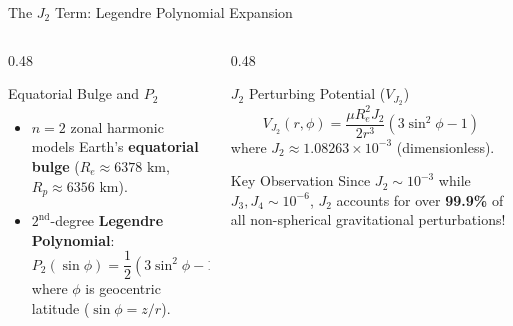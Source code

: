 \documentclass[aspectratio=169,11pt]{beamer}
\begin{document}
\begin{frame}{The $J_2$ Term: Legendre Polynomial Expansion}
    \begin{columns}[t]
        \begin{column}{0.48\textwidth}
            \begin{block}{Equatorial Bulge and $P_2$}
                \begin{itemize}
                    \item $n=2$ zonal harmonic models Earth's \textbf{equatorial bulge} ($R_e \approx 6378\text{ km}$, $R_p \approx 6356\text{ km}$).
                    \item $2^{\text{nd}}$-degree \textbf{Legendre Polynomial}:
                    \begin{equation*}
                        P_2(\sin\phi) = \frac{1}{2}\left( 3\sin^2\phi - 1 \right)
                    \end{equation*}
                    where $\phi$ is geocentric latitude ($\sin\phi = z/r$).
                \end{itemize}
            \end{block}
        \end{column}

        \begin{column}{0.48\textwidth}
            \begin{block}{$J_2$ Perturbing Potential ($V_{J_2}$)}
                \begin{equation*}
                    V_{J_2}(r, \phi) = \frac{\mu R_e^2 J_2}{2 r^3} \left( 3\sin^2\phi - 1 \right)
                \end{equation*}
                where $J_2 \approx 1.08263 \times 10^{-3}$ (dimensionless).
            \end{block}

            \begin{alertblock}{Key Observation}
                Since $J_2 \sim 10^{-3}$ while $J_3, J_4 \sim 10^{-6}$, $J_2$ accounts for over \textbf{99.9\%} of all non-spherical gravitational perturbations!
            \end{alertblock}
        \end{column}
    \end{columns}
\end{frame}
\end{document}
